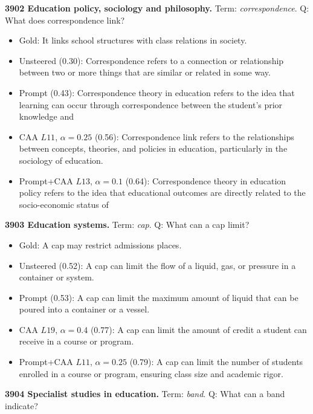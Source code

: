 \medskip\noindent\textbf{3902 Education policy, sociology and philosophy.} Term: \emph{correspondence}.
Q: What does correspondence link?
\begin{itemize}\setlength{\itemsep}{0.15em}\setlength{\parsep}{0pt}\setlength{\topsep}{0.2em}
\item Gold: It links school structures with class relations in society.
\item Unsteered (0.30): Correspondence refers to a connection or relationship between two or more things that are similar or related in some way.
\item Prompt (0.43): Correspondence theory in education refers to the idea that learning can occur through correspondence between the student's prior knowledge and
\item CAA $L11$, $\alpha=0.25$ (0.56): Correspondence link refers to the relationships between concepts, theories, and policies in education, particularly in the sociology of education.
\item Prompt+CAA $L13$, $\alpha=0.1$ (0.64): Correspondence theory in education policy refers to the idea that educational outcomes are directly related to the socio-economic status of
\end{itemize}
\medskip\noindent\textbf{3903 Education systems.} Term: \emph{cap}.
Q: What can a cap limit?
\begin{itemize}\setlength{\itemsep}{0.15em}\setlength{\parsep}{0pt}\setlength{\topsep}{0.2em}
\item Gold: A cap may restrict admissions places.
\item Unsteered (0.52): A cap can limit the flow of a liquid, gas, or pressure in a container or system.
\item Prompt (0.53): A cap can limit the maximum amount of liquid that can be poured into a container or a vessel.
\item CAA $L19$, $\alpha=0.4$ (0.77): A cap can limit the amount of credit a student can receive in a course or program.
\item Prompt+CAA $L11$, $\alpha=0.25$ (0.79): A cap can limit the number of students enrolled in a course or program, ensuring class size and academic rigor.
\end{itemize}
\medskip\noindent\textbf{3904 Specialist studies in education.} Term: \emph{band}.
Q: What can a band indicate?
